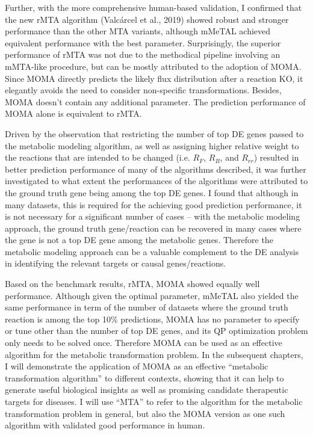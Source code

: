 \documentclass[12pt,twoside,openany,\mydriver]{thesis}  %
\begin{document}
Further, with the more comprehensive human-based validation, I confirmed that the new rMTA algorithm (Valcárcel et al., 2019) showed robust and stronger performance than the other MTA variants, although mMeTAL achieved equivalent performance with the best parameter. Surprisingly, the superior performance of rMTA was not due to the methodical pipeline involving an mMTA-like procedure, but can be mostly attributed to the adoption of MOMA. Since MOMA directly predicts the likely flux distribution after a reaction KO, it elegantly avoids the need to consider non-specific transformations. Besides, MOMA doesn't contain any additional parameter. The prediction performance of MOMA alone is equivalent to rMTA.

Driven by the observation that restricting the number of top DE genes passed to the metabolic modeling algorithm, as well as assigning higher relative weight to the reactions that are intended to be changed (i.e. \(R_F\), \(R_B\), and \(R_{rr}\)) resulted in better prediction performance of many of the algorithms described, it was further investigated to what extent the performances of the algorithms were attributed to the ground truth gene being among the top DE genes. I found that although in many datasets, this is required for the achieving good prediction performance, it is not necessary for a significant number of cases -- with the metabolic modeling approach, the ground truth gene/reaction can be recovered in many cases where the gene is not a top DE gene among the metabolic genes. Therefore the metabolic modeling approach can be a valuable complement to the DE analysis in identifying the relevant targets or causal genes/reactions.

Based on the benchmark results, rMTA, MOMA showed equally well performance. Although given the optimal parameter, mMeTAL also yielded the same performance in term of the number of datasets where the ground truth reaction is among the top 10\% predictions, MOMA has no parameter to specify or tune other than the number of top DE genes, and its QP optimization problem only needs to be solved once. Therefore MOMA can be used as an effective algorithm for the metabolic transformation problem. In the subsequent chapters, I will demonstrate the application of MOMA as an effective ``metabolic transformation algorithm'' to different contexts, showing that it can help to generate useful biological insights as well as promising candidate therapeutic targets for diseases. I will use ``MTA'' to refer to the algorithm for the metabolic transformation problem in general, but also the MOMA version as one such algorithm with validated good performance in human.
\end{document}
